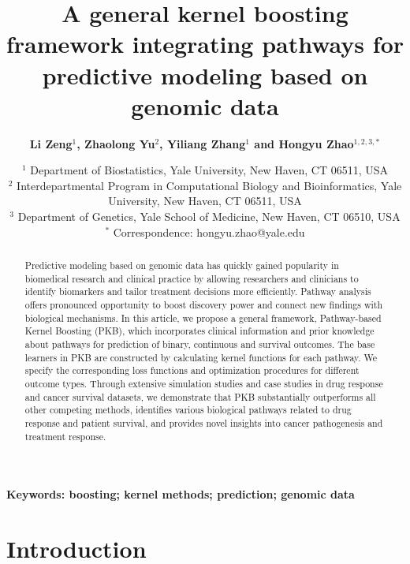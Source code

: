 \documentclass[a4paper,12pt]{article}
\begin{document}
	\title{\bf A general kernel boosting framework integrating pathways for predictive modeling based on genomic data}
	\author{\bf Li Zeng$^{1}$, Zhaolong Yu$^2$, Yiliang Zhang$^1$ and Hongyu Zhao$^{1,2,3,*}$}
	\date{
		$^1$ Department of Biostatistics, Yale University, New Haven, CT 06511, USA\\
	$^2$ Interdepartmental Program in Computational Biology and Bioinformatics, Yale University, New Haven, CT 06511, USA\\
	$^3$ Department of Genetics, Yale School of Medicine, New Haven, CT 06510, USA\\
	$^*$ Correspondence: hongyu.zhao@yale.edu
}
	\maketitle
	\begin{abstract}
Predictive modeling based on genomic data has quickly gained popularity in biomedical research and clinical practice by allowing researchers and clinicians to identify biomarkers and tailor treatment decisions more efficiently. Pathway analysis offers pronounced opportunity to boost discovery power and connect new findings with biological mechanisms. In this article, we propose a general framework, Pathway-based Kernel Boosting (PKB), which incorporates clinical information and prior knowledge about pathways for prediction of binary, continuous and survival outcomes. The base learners in PKB are constructed by calculating kernel functions for each pathway. We specify the corresponding loss functions and optimization procedures for different outcome types. Through extensive simulation studies and case studies in drug response and cancer survival datasets, we demonstrate that PKB substantially outperforms all other competing methods, identifies various biological pathways related to drug response and patient survival, and provides novel insights into cancer pathogenesis and treatment response.
		\end{abstract}

		\begin{center}
			\textbf{Keywords: boosting; kernel methods; prediction; genomic data}
			\end{center}

	

	\section{Introduction}
\end{document}
